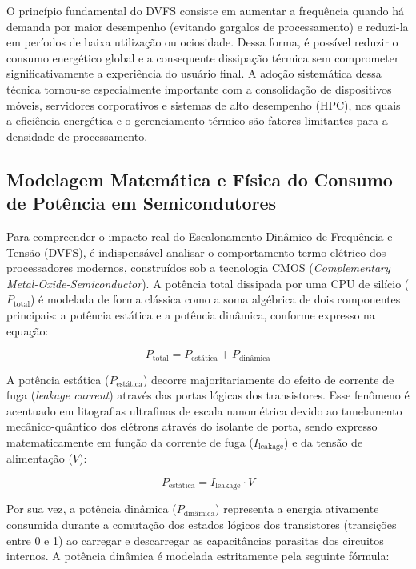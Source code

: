 \documentclass[12pt]{article}
\begin{document}
O princípio fundamental do DVFS consiste em aumentar a frequência quando há demanda por maior desempenho (evitando gargalos de processamento) e reduzi-la em períodos de baixa utilização ou ociosidade. Dessa forma, é possível reduzir o consumo energético global e a consequente dissipação térmica sem comprometer significativamente a experiência do usuário final. A adoção sistemática dessa técnica tornou-se especialmente importante com a consolidação de dispositivos móveis, servidores corporativos e sistemas de alto desempenho (HPC), nos quais a eficiência energética e o gerenciamento térmico são fatores limitantes para a densidade de processamento.

\subsection{Modelagem Matemática e Física do Consumo de Potência em Semicondutores}

Para compreender o impacto real do Escalonamento Dinâmico de Frequência e Tensão (DVFS), é indispensável analisar o comportamento termo-elétrico dos processadores modernos, construídos sob a tecnologia CMOS (\textit{Complementary Metal-Oxide-Semiconductor}). A potência total dissipada por uma CPU de silício ($P_{\text{total}}$) é modelada de forma clássica como a soma algébrica de dois componentes principais: a potência estática e a potência dinâmica, conforme expresso na equação:

\begin{equation}
P_{\text{total}} = P_{\text{estática}} + P_{\text{dinâmica}}
\end{equation}

A potência estática ($P_{\text{estática}}$) decorre majoritariamente do efeito de corrente de fuga (\textit{leakage current}) através das portas lógicas dos transistores. Esse fenômeno é acentuado em litografias ultrafinas de escala nanométrica devido ao tunelamento mecânico-quântico dos elétrons através do isolante de porta, sendo expresso matematicamente em função da corrente de fuga ($I_{\text{leakage}}$) e da tensão de alimentação ($V$):

\begin{equation}
P_{\text{estática}} = I_{\text{leakage}} \cdot V
\end{equation}

Por sua vez, a potência dinâmica ($P_{\text{dinâmica}}$) representa a energia ativamente consumida durante a comutação dos estados lógicos dos transistores (transições entre 0 e 1) ao carregar e descarregar as capacitâncias parasitas dos circuitos internos. A potência dinâmica é modelada estritamente pela seguinte fórmula:
\end{document}
